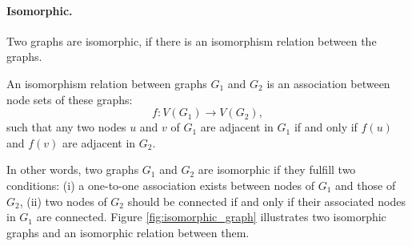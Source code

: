 \paragraph{Isomorphic.}
Two graphs are isomorphic, if there is an isomorphism relation between the graphs. 

\begin{definition}
	An isomorphism relation between graphs $G_1$ and $G_2$ is an association between node sets of these graphs:
	\begin{equation}
	f: V \left( G_1 \right) \rightarrow V \left( G_2 \right),
	\end{equation}
	such that any two nodes $u$ and $v$ of $G_1$ are adjacent in $G_1$ if and only if $f \left( u \right)$ and $f \left( v \right)$ are adjacent in $G_2$. 
\end{definition}

In other words, two graphs $G_1$ and $G_2$ are isomorphic if they fulfill two conditions: 
(i) a one\--to\--one association exists between nodes of $G_1$ and those of $G_2$, 
(ii) two nodes of $G_2$ should be connected if and only if their associated nodes in $G_1$ are connected. 
Figure \ref{fig:isomorphic_graph} illustrates two isomorphic graphs and an isomorphic relation between them.  

